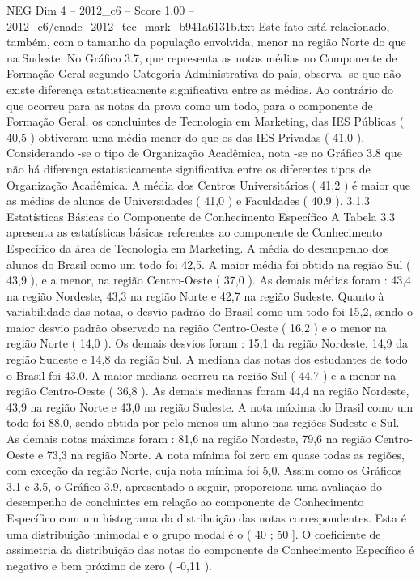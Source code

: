 \begin{textsample}{NEG Dim 4 – 2012\_c6 – Score 1.00 – 2012\_c6/enade\_2012\_tec\_mark\_b941a6131b.txt}
Este fato está relacionado, também, com o tamanho da população envolvida, menor na região Norte do que na Sudeste.
No Gráfico 3.7, que representa as notas médias no Componente de Formação Geral segundo Categoria Administrativa do país, observa -se que não existe diferença estatisticamente significativa entre as médias.
Ao contrário do que ocorreu para as notas da prova como um todo, para o componente de Formação Geral, os concluintes de Tecnologia em Marketing, das IES Públicas ( 40,5 ) obtiveram uma média menor do que os das IES Privadas ( 41,0 ).
Considerando -se o tipo de Organização Acadêmica, nota -se no Gráfico 3.8 que não há diferença estatisticamente significativa entre os diferentes tipos de Organização Acadêmica.
A média dos Centros Universitários ( 41,2 ) é maior que as médias de alunos de Universidades ( 41,0 ) e Faculdades ( 40,9 ). 3.1.3 Estatísticas Básicas do Componente de Conhecimento Específico A Tabela 3.3 apresenta as estatísticas básicas referentes ao componente de Conhecimento Específico da área de Tecnologia em Marketing.
A média do desempenho dos alunos do Brasil como um todo foi 42,5.
A maior média foi obtida na região Sul ( 43,9 ), e a menor, na região Centro-Oeste ( 37,0 ).
As demais médias foram : 43,4 na região Nordeste, 43,3 na região Norte e 42,7 na região Sudeste.
Quanto à variabilidade das notas, o desvio padrão do Brasil como um todo foi 15,2, sendo o maior desvio padrão observado na região Centro-Oeste ( 16,2 ) e o menor na região Norte ( 14,0 ).
Os demais desvios foram : 15,1 da região Nordeste, 14,9 da região Sudeste e 14,8 da região Sul.
A mediana das notas dos estudantes de todo o Brasil foi 43,0.
A maior mediana ocorreu na região Sul ( 44,7 ) e a menor na região Centro-Oeste ( 36,8 ).
As demais medianas foram 44,4 na região Nordeste, 43,9 na região Norte e 43,0 na região Sudeste.
A nota máxima do Brasil como um todo foi 88,0, sendo obtida por pelo menos um aluno nas regiões Sudeste e Sul.
As demais notas máximas foram : 81,6 na região Nordeste, 79,6 na região Centro-Oeste e 73,3 na região Norte.
A nota mínima foi zero em quase todas as regiões, com exceção da região Norte, cuja nota mínima foi 5,0.
Assim como os Gráficos 3.1 e 3.5, o Gráfico 3.9, apresentado a seguir, proporciona uma avaliação do desempenho de concluintes em relação ao componente de Conhecimento Específico com um histograma da distribuição das notas correspondentes.
Esta é uma distribuição unimodal e o grupo modal é o ( 40 ; 50 ].
O coeficiente de assimetria da distribuição das notas do componente de Conhecimento Específico é negativo e bem próximo de zero ( -0,11 ).

\end{textsample}
